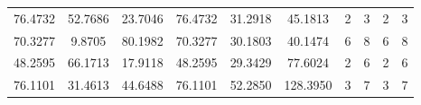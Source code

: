 \documentclass[withoutpreface,bwprint]{cumcmthesis} %
\begin{document}
\begin{appendices}
\begin{table}[htbp!]
\begin{tabular}{@{}cccccccccc@{}}
							76.4732                          & 52.7686                          & 23.7046                          & 76.4732                          & 31.2918                          & 45.1813                          & 2                    & 3                    & 2                      & 3                      \\
							70.3277                          & 9.8705                           & 80.1982                          & 70.3277                          & 30.1803                          & 40.1474                          & 6                    & 8                    & 6                      & 8                      \\
							48.2595                          & 66.1713                          & 17.9118                          & 48.2595                          & 29.3429                          & 77.6024                          & 2                    & 6                    & 2                      & 6                      \\
							76.1101                          & 31.4613                          & 44.6488                          & 76.1101                          & 52.2850                          & 128.3950                         & 3                    & 7                    & 3                      & 7                      \\ \bottomrule
						\end{tabular}
					\end{table}
				

\end{appendices}
\end{document}
